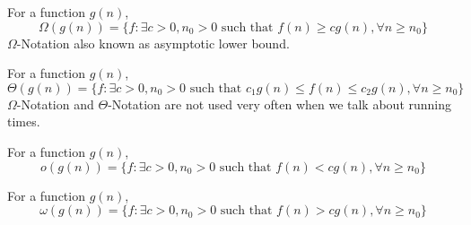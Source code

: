 					\begin{definition}
						For a function $g(n)$, 
						\begin{equation*}
							\Omega(g(n)) = \{f: \exists c > 0, n_0 > 0 \text{ such that } f(n) \ge cg(n), \forall n\ge n_0\}
						\end{equation*}
						$\Omega$-Notation also known as asymptotic lower bound.
					\end{definition}
					
					\begin{definition}
						For a function $g(n)$, 
						\begin{equation*}
							\Theta(g(n)) = \{f: \exists c > 0, n_0 > 0 \text{ such that }  c_1g(n) \le f(n) \le c_2g(n), \forall n\ge n_0\}
						\end{equation*}
						$\Omega$-Notation and $\Theta$-Notation are not used very often when we talk about running times.
					\end{definition}
					
					\begin{definition}[$o$-Notation]
						For a function $g(n)$, 
						\begin{equation*}
							o(g(n)) = \{f: \exists c > 0, n_0 > 0 \text{ such that } f(n) < cg(n), \forall n\ge n_0\}
						\end{equation*}					
					\end{definition}

					\begin{definition}
						For a function $g(n)$, 
						\begin{equation*}
							\omega(g(n)) = \{f: \exists c > 0, n_0 > 0 \text{ such that } f(n) > cg(n), \forall n\ge n_0\}
						\end{equation*}					
					\end{definition}


